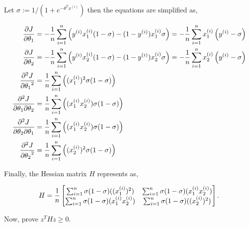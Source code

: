 \begin{answer}
Let $\sigma := 1/(1 + e^{-\theta^T x^{(i)}})$ then the equations are simplified as,

$$
\begin{aligned}
{\partial J \over {\partial \theta_1}} 
&= - {1 \over n} \sum_{i=1}^n \left( 
y^{(i)} x_1^{(i)} (1 - \sigma)
- (1-y^{(i)}) x_1^{(i)} \sigma
\right) 
= - {1 \over n} \sum_{i=1}^n x_1^{(i)} \left(
y^{(i)} - \sigma
\right) \\
{\partial J \over {\partial \theta_2}} 
&= - {1 \over n} \sum_{i=1}^n \left( 
y^{(i)} x_2^{(i)} (1 - \sigma)
- (1-y^{(i)}) x_2^{(i)} \sigma
\right) 
= - {1 \over n} \sum_{i=1}^n x_2^{(i)} \left(
y^{(i)} - \sigma
\right) \\
{\partial^2 J \over {\partial \theta_1}^2} 
&= {1 \over n} \sum_{i=1}^n \left( 
(x_1^{(i)})^2 \sigma (1-\sigma)
\right) \\
{\partial^2 J \over {\partial \theta_1\partial \theta_2}} 
&= {1 \over n} \sum_{i=1}^n \left( 
(x_1^{(i)}x_2^{(i)}) \sigma (1-\sigma)
\right) \\
{\partial^2 J \over {\partial \theta_2 \partial \theta_1}} 
&= {1 \over n} \sum_{i=1}^n \left( 
(x_1^{(i)}x_2^{(i)}) \sigma (1-\sigma)
\right) \\
{\partial^2 J \over {\partial \theta_2}^2}
&= {1 \over n} \sum_{i=1}^n \left( 
(x_2^{(i)})^2 \sigma (1-\sigma)
\right) \\
\end{aligned}
$$

Finally, the Hessian matrix $H$ represents as,

$$
H = {1 \over n}
\begin{bmatrix}
    \sum_{i=1}^n \sigma (1-\sigma) ((x_1^{(i)})^2) & \sum_{i=1}^n \sigma (1-\sigma) (x_1^{(i)}x_2^{(i)}) \\
    \sum_{i=1}^n \sigma (1-\sigma) (x_1^{(i)}x_2^{(i)}) & \sum_{i=1}^n \sigma (1-\sigma) ((x_2^{(i)})^2) \\
\end{bmatrix}.
$$

Now, prove $z^T H z \geq 0$.


\end{answer}
